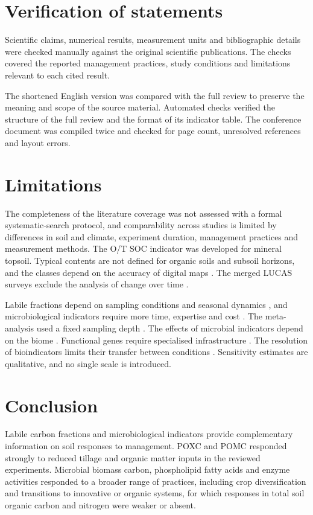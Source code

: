 \documentclass[english]{ai4science_ysda}
\begin{document}
\section{Verification of statements}

\porozhdeno{} Scientific claims, numerical results, measurement units and
bibliographic details were checked manually against the original scientific
publications. The checks covered the reported management practices, study
conditions and limitations relevant to each cited result.

The shortened English version was compared with the full review to preserve the
meaning and scope of the source material. Automated checks verified the
structure of the full review and the format of its indicator table. The
conference document was compiled twice and checked for page count, unresolved
references and layout errors.

\section{Limitations}

\porozhdeno{} The completeness of the literature coverage was not assessed with a formal
systematic-search protocol, and comparability across studies is limited by
differences in soil and climate, experiment duration, management practices and
measurement methods. The O/T SOC indicator was developed for mineral topsoil.
Typical contents are not defined for organic soils and subsoil horizons, and the
classes depend on the accuracy of digital maps \cite{feeney2024}. The merged
LUCAS surveys exclude the analysis of change over time \cite{feeney2024}.

Labile fractions depend on sampling conditions and seasonal dynamics
\cite{bongiorno2019}, and microbiological indicators require more time, expertise
and cost \cite{cusset2024}. The meta-analysis used a fixed sampling depth
\cite{cusset2024}. The effects of microbial indicators depend on the biome
\cite{trivedi2016}. Functional genes require specialised infrastructure
\cite{jia2025}. The resolution of bioindicators limits their transfer between
conditions \cite{bhaduri2022}. Sensitivity estimates are qualitative, and no
single scale is introduced.

\section*{Conclusion}

\porozhdeno{} Labile carbon fractions and microbiological indicators provide
complementary information on soil responses to management. POXC and POMC
responded strongly to reduced tillage and organic matter inputs in the reviewed
experiments. Microbial biomass carbon, phospholipid fatty acids and enzyme
activities responded to a broader range of practices, including crop
diversification and transitions to innovative or organic systems, for which
responses in total soil organic carbon and nitrogen were weaker or absent.
\end{document}
